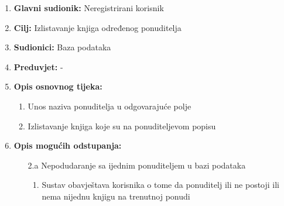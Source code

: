 \noindent {}
\begin{enumerate}
	
	\item \textbf{Glavni sudionik: } Neregistrirani korisnik
	\item  \textbf{Cilj:} Izlistavanje knjiga određenog ponuditelja
	\item  \textbf{Sudionici:} Baza podataka
	\item  \textbf{Preduvjet:} -
	\item  \textbf{Opis osnovnog tijeka:}
	
	\begin{enumerate}
		
		\item Unos naziva ponuditelja u odgovarajuće polje
		\item Izlistavanje knjiga koje su na ponuditeljevom popisu
		
	\end{enumerate}
	
	\item  \textbf{Opis mogućih odstupanja:}
	
	\item[] \begin{enumerate}
		
		\item[2.a] Nepodudaranje sa ijednim ponuditeljem u bazi podataka
		\item[] \begin{enumerate}
			
			\item Sustav obavještava korisnika o tome da ponuditelj ili ne postoji ili nema nijednu knjigu na trenutnoj ponudi
			
		\end{enumerate}
		
	\end{enumerate}
	
\end{enumerate}

